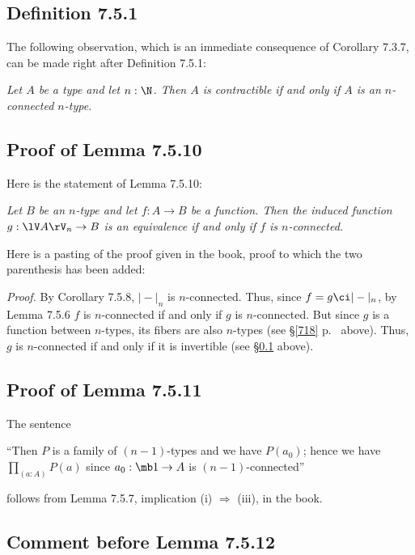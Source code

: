 \documentclass[12pt]{article}
\begin{document}

\subsection{Definition 7.5.1}\label{751}

The following observation, which is an immediate consequence of Corollary 7.3.7, can be made right after Definition 7.5.1:

\nn\emph{Let $A$ be a type and let $n:\N$. Then $A$ is contractible if and only if $A$ is an $n$-connected $n$-type.}


\subsection{Proof of Lemma 7.5.10}

Here is the statement of Lemma 7.5.10:

\nn{} \emph{Let $B$ be an $n$-type and let $f:A\to B$ be a function. Then the induced function $g:\lV A\rV_n\to B$ is an equivalence if and only if $f$ is $n$-connected.}

Here is a pasting of the proof given in the book, proof to which the two parenthesis has been added: 

\nn\emph{Proof.} By Corollary 7.5.8, $\vert-\vert_n$ is $n$-connected. Thus, since $f=g\ci\vert-\vert_n$, by Lemma 7.5.6 $f$ is $n$-connected if and only if $g$ is $n$-connected. But since $g$ is a function between $n$-types, its fibers are also $n$-types (see \S\ref{718} p.~\pageref{718} above). Thus, $g$ is $n$-connected if and only if it is invertible (see \S\ref{751} above).


\subsection{Proof of Lemma 7.5.11}

The sentence 

\nn``Then $P$ is a family of $(n-1)$-types and we have $P(a_0)$; hence we have $\prod_{(a:A)}P(a)$ since $a_0:\mb1\to A$ is $(n-1)$-connected''

\nn follows from Lemma 7.5.7, implication (i) $\Rightarrow$ (iii), in the book.


\subsection{Comment before Lemma 7.5.12}\label{7512}
\end{document}
